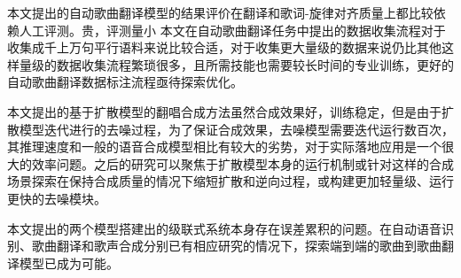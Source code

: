 本文提出的自动歌曲翻译模型的结果评价在翻译和歌词-旋律对齐质量上都比较依赖人工评测。贵，评测量小
本文在自动歌曲翻译任务中提出的数据收集流程对于收集成千上万句平行语料来说比较合适，对于收集更大量级的数据来说仍比其他这样量级的数据收集流程繁琐很多，且所需技能也需要较长时间的专业训练，更好的自动歌曲翻译数据标注流程亟待探索优化。

本文提出的基于扩散模型的翻唱合成方法虽然合成效果好，训练稳定，但是由于扩散模型迭代进行的去噪过程，为了保证合成效果，去噪模型需要迭代运行数百次，其推理速度和一般的语音合成模型相比有较大的劣势，对于实际落地应用是一个很大的效率问题。之后的研究可以聚焦于扩散模型本身的运行机制或针对这样的合成场景探索在保持合成质量的情况下缩短扩散和逆向过程，或构建更加轻量级、运行更快的去噪模块。

本文提出的两个模型搭建出的级联式系统本身存在误差累积的问题。在自动语音识别、歌曲翻译和歌声合成分别已有相应研究的情况下，探索端到端的歌曲到歌曲翻译模型已成为可能。
